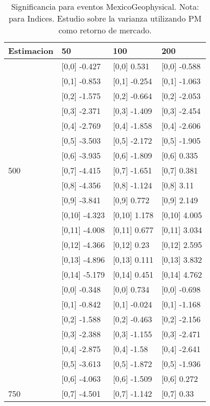 \begin{table}

\caption{Significancia para eventos MexicoGeophysical. Nota: para Indices. Estudio sobre la varianza utilizando PM como retorno de mercado.}
\centering
\begin{tabular}[t]{llll}
\toprule
Estimacion & 50 & 100 & 200\\
\midrule
 & {}[0,0] -0.427 & {}[0,0] 0.531 & {}[0,0] -0.588\\
 & {}[0,1] -0.853 & {}[0,1] -0.254 & {}[0,1] -1.063\\
 & {}[0,2] -1.575 & {}[0,2] -0.664 & {}[0,2] -2.053\\
 & {}[0,3] -2.371 & {}[0,3] -1.409 & {}[0,3] -2.454\\
 & {}[0,4] -2.769 & {}[0,4] -1.858 & {}[0,4] -2.606\\
\addlinespace
 & {}[0,5] -3.503 & {}[0,5] -2.172 & {}[0,5] -1.905\\
 & {}[0,6] -3.935 & {}[0,6] -1.809 & {}[0,6] 0.335\\
500 & {}[0,7] -4.415 & {}[0,7] -1.651 & {}[0,7] 0.381\\
 & {}[0,8] -4.356 & {}[0,8] -1.124 & {}[0,8] 3.11\\
 & {}[0,9] -3.841 & {}[0,9] 0.772 & {}[0,9] 2.149\\
\addlinespace
 & {}[0,10] -4.323 & {}[0,10] 1.178 & {}[0,10] 4.005\\
 & {}[0,11] -4.008 & {}[0,11] 0.677 & {}[0,11] 3.034\\
 & {}[0,12] -4.366 & {}[0,12] 0.23 & {}[0,12] 2.595\\
 & {}[0,13] -4.896 & {}[0,13] 0.111 & {}[0,13] 3.832\\
 & {}[0,14] -5.179 & {}[0,14] 0.451 & {}[0,14] 4.762\\
\addlinespace
 & {}[0,0] -0.348 & {}[0,0] 0.734 & {}[0,0] -0.698\\
 & {}[0,1] -0.842 & {}[0,1] -0.024 & {}[0,1] -1.168\\
 & {}[0,2] -1.588 & {}[0,2] -0.463 & {}[0,2] -2.156\\
 & {}[0,3] -2.388 & {}[0,3] -1.155 & {}[0,3] -2.471\\
 & {}[0,4] -2.875 & {}[0,4] -1.58 & {}[0,4] -2.641\\
\addlinespace
 & {}[0,5] -3.613 & {}[0,5] -1.872 & {}[0,5] -1.936\\
 & {}[0,6] -4.063 & {}[0,6] -1.509 & {}[0,6] 0.272\\
750 & {}[0,7] -4.501 & {}[0,7] -1.142 & {}[0,7] 0.33\\

\end{tabular}
\end{table}
